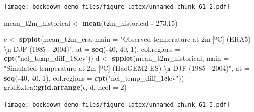 \documentclass[]{book}
\newenvironment{Shaded}{\begin{snugshade}}{\end{snugshade}}
\newcommand{\CharTok}[1]{\textcolor[rgb]{0.31,0.60,0.02}{#1}}
\newcommand{\DataTypeTok}[1]{\textcolor[rgb]{0.13,0.29,0.53}{#1}}
\newcommand{\DecValTok}[1]{\textcolor[rgb]{0.00,0.00,0.81}{#1}}
\newcommand{\FloatTok}[1]{\textcolor[rgb]{0.00,0.00,0.81}{#1}}
\newcommand{\KeywordTok}[1]{\textcolor[rgb]{0.13,0.29,0.53}{\textbf{#1}}}
\newcommand{\NormalTok}[1]{#1}
\newcommand{\OperatorTok}[1]{\textcolor[rgb]{0.81,0.36,0.00}{\textbf{#1}}}
\newcommand{\StringTok}[1]{\textcolor[rgb]{0.31,0.60,0.02}{#1}}
\begin{document}
\texttt{[image: bookdown-demo\_files/figure-latex/unnamed-chunk-61-2.pdf]}

\begin{Shaded}
\begin{Highlighting}[]
\NormalTok{mean_t2m_historical <-}\StringTok{ }\KeywordTok{mean}\NormalTok{(t2m_historical }\OperatorTok{-}\StringTok{ }\FloatTok{273.15}\NormalTok{)}

\NormalTok{c <-}\StringTok{ }\KeywordTok{spplot}\NormalTok{(mean_t2m_era,}
            \DataTypeTok{main =} \StringTok{"Observed temperature at 2m [ºC] (ERA5) }\CharTok{\textbackslash{}n}\StringTok{ DJF (1985 - 2004)"}\NormalTok{,}
            \DataTypeTok{at =} \KeywordTok{seq}\NormalTok{(}\OperatorTok{-}\DecValTok{40}\NormalTok{, }\DecValTok{40}\NormalTok{, }\DecValTok{1}\NormalTok{),}
            \DataTypeTok{col.regions =} \KeywordTok{cpt}\NormalTok{(}\StringTok{"ncl_temp_diff_18lev"}\NormalTok{))}
\NormalTok{d <-}\StringTok{ }\KeywordTok{spplot}\NormalTok{(mean_t2m_historical,}
            \DataTypeTok{main =} \StringTok{"Simulated temperature at 2m [ºC] (HadGEM2-ES) }\CharTok{\textbackslash{}n}\StringTok{ DJF (1985 - 2004)"}\NormalTok{,}
            \DataTypeTok{at =} \KeywordTok{seq}\NormalTok{(}\OperatorTok{-}\DecValTok{40}\NormalTok{, }\DecValTok{40}\NormalTok{, }\DecValTok{1}\NormalTok{),}
            \DataTypeTok{col.regions =} \KeywordTok{cpt}\NormalTok{(}\StringTok{"ncl_temp_diff_18lev"}\NormalTok{))}
\NormalTok{gridExtra}\OperatorTok{::}\KeywordTok{grid.arrange}\NormalTok{(c, d, }\DataTypeTok{ncol =} \DecValTok{2}\NormalTok{)}
\end{Highlighting}
\end{Shaded}

\texttt{[image: bookdown-demo\_files/figure-latex/unnamed-chunk-61-3.pdf]}
\end{document}
